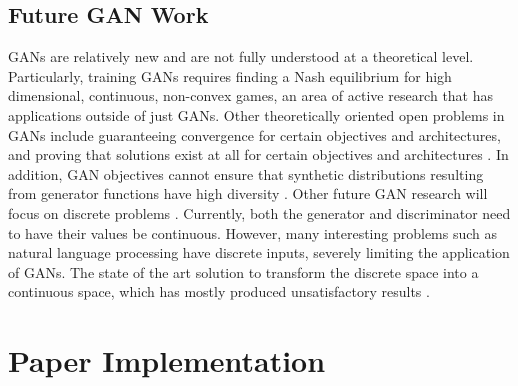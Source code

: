 \documentclass{article}
\begin{document}
\subsection{Future GAN Work}
GANs are relatively new and are not fully understood at a theoretical level. Particularly, training GANs requires finding a Nash equilibrium for high dimensional, continuous, non-convex games, an area of active research that has applications outside of just GANs. Other theoretically oriented open problems in GANs include guaranteeing convergence for certain objectives and architectures, and proving that solutions exist at all for certain objectives and architectures \citep{Arora17}. In addition, GAN objectives cannot ensure that synthetic distributions resulting from generator functions have high diversity \citep{Arora17}. Other future GAN research will focus on discrete problems \citep{Che+al-2017-augmented}. Currently, both the generator and discriminator need to have their values be continuous. However, many interesting problems such as natural language processing have discrete inputs, severely limiting the application of GANs. The state of the art solution to transform the discrete space into a continuous space, which has mostly produced unsatisfactory results \citep{Che+al-2017-augmented}.

\section{Paper Implementation}
\end{document}
